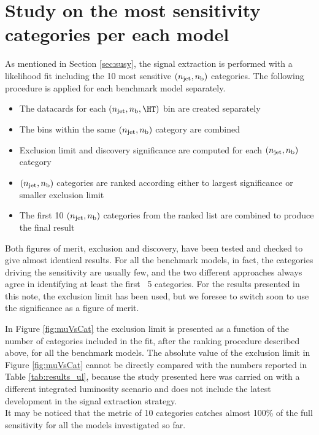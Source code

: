 \section{Study on the most sensitivity categories per each model}
\label{sec:sensitivity-study}
As mentioned in Section \ref{sec:susy}, the signal extraction is performed with a likelihood fit including the 
10 most sensitive $(n_{\text{jet}},n_{\text{b}})$ categories. 
The following procedure is applied for each benchmark model separately.

\begin{itemize}
\item The datacards for each $(\njet,\nb,\HT)$ bin are created separately
\item The \HT bins within the same $(n_{\text{jet}},n_{\text{b}})$ category are combined
\item Exclusion limit and discovery significance are computed for each $(n_{\text{jet}},n_{\text{b}})$ category
\item $(n_{\text{jet}},n_{\text{b}})$ categories are ranked according either to largest significance or smaller exclusion limit
\item The first 10 $(n_{\text{jet}},n_{\text{b}})$ categories from the ranked list are combined to produce the final result
\end{itemize}

Both figures of merit, exclusion and discovery, have been tested and checked to give almost identical results. 
For all the benchmark models, in fact, the categories driving the sensitivity are usually few, 
and the two different approaches always agree in identifying at least the first ~5 categories. 
For the results presented in this note, the exclusion limit has been used, but we foresee to switch soon 
to use the significance as a figure of merit. 

In Figure \ref{fig:muVsCat} the exclusion limit is presented as a function of the number of categories 
included in the fit, after the ranking procedure described above, for all the benchmark models. 
The absolute value of the exclusion limit in Figure \ref{fig:muVsCat} cannot be directly compared with the numbers reported in Table \ref{tab:results_ul}, 
because the study presented here was carried on with a different integrated luminosity scenario and does not include the latest development in the signal extraction strategy. \\
It may be noticed that the metric of 10 categories catches almost 100\% of the full sensitivity 
for all the models investigated so far.


